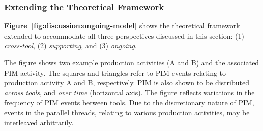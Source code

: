 \subsubsection{Extending the Theoretical Framework}

\textbf{Figure~\ref{fig:discussion:ongoing-model}} shows the theoretical framework extended to accommodate all three perspectives discussed in this section: (1) \textit{cross-tool}, (2) \textit{supporting}, and (3) \textit{ongoing}.  %


The figure shows two example production activities (A and B) and the associated PIM activity.  The squares and triangles refer to PIM events relating to production activity A and B, respectively.   PIM is also shown to be distributed \textit{across tools}, and \textit{over time} (horizontal axis).    The figure reflects variations in the frequency of PIM events between tools.  Due to the discretionary nature of PIM, events in the parallel threads, relating to various production activities, may be interleaved arbitrarily.

